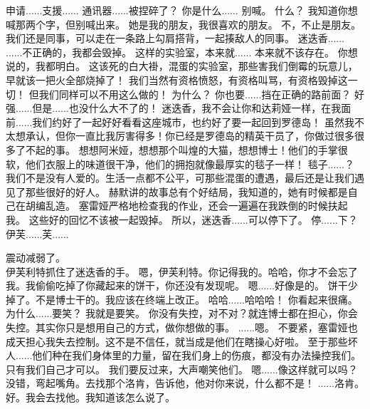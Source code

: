 \documentclass[openany]{book}
\begin{document}
\begin{dialogue}
     申请......支援......
     通讯器......被捏碎了？
     你是什么......
     别喊。
     什么？
     我知道你想喊那两个字，但别喊出来。
     她是我的朋友，我很喜欢的朋友。
     不，不止是朋友。我们还是同事，可以走在一条路上勾肩搭背，一起揍敌人的同事。
     迷迭香......
     ......不正确的，我都会毁掉。
     这样的实验室，本来就......
     本来就不该存在。
     你想说的，我都明白。
     这该死的白大褂，混蛋的实验室，那些害我们倒霉的玩意儿，早就该一把火全部烧掉了！
     我们当然有资格愤怒，有资格叫骂，有资格毁掉这一切！
     但我们同样可以不用这么做的！
     为什么？
     你也要......挡在正确的路前面？
     好强......但是......也没什么大不了的！
     迷迭香，我不会让你和达莉娅一样，在我面前......我们约好了一起好好看看这座城市，也约好了要一起回到罗德岛！
     虽然我不太想承认，但你一直比我厉害得多！你已经是罗德岛的精英干员了，你做过很多很多了不起的事。
     想想阿米娅，想想那个叫煌的大猫，想想博士！他们的手掌很软，他们衣服上的味道很干净，他们的拥抱就像最厚实的毯子一样！
     毯子......？
     我们不是没有人爱的。生活一点都不公平，可那些混蛋的遭遇，最后还是让我们遇见了那些很好的好人。
     赫默讲的故事总有个好结局，我知道的，她有时候都是自己在胡编乱造。
     塞雷娅严格地检查我的作业，还会一遍遍在我跌倒的时候扶起我。
     这些好的回忆不该被一起毁掉。
     所以，迷迭香......可以停下了。
     停......下？
     伊芙......芙......\par
    震动减弱了。\\
    伊芙利特抓住了迷迭香的手。
     嗯，伊芙利特。你记得我的。哈哈，你才不会忘了我。我偷偷吃掉了你藏起来的饼干，你还没有发现呢。
     嗯......好像是的。
     饼干少掉了。不是博士干的。我应该在终端上改正。
     哈哈......哈哈哈！
     你看起来很痛。为什么......要笑？
     我就是要笑。
     你没有失控，对不对？就连博士都在担心，你会失控。其实你只是想用自己的方式，做你想做的事。
     ......嗯。
     不要紧，塞雷娅也成天担心我失去控制。这不是不信任，就当成是他们在瞎操心好啦。
     至于那些坏人......他们种在我们身体里的力量，留在我们身上的伤痕，都没有办法操控我们。
     只有我们自己才可以。
     我们要反过来，大声嘲笑他们。
     嗯......像这样就可以吗？
     没错，弯起嘴角。去找那个洛肯，告诉他，他对你来说，什么都不是！
     ......洛肯。
     好。我会去找他。我知道该怎么说了。
\end{dialogue}
\end{document}
